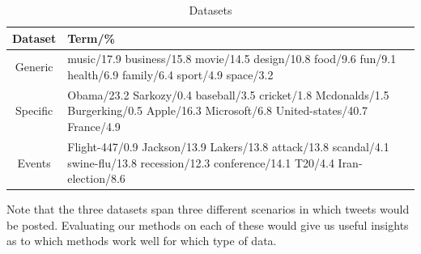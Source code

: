 \documentclass{sig-alternate}
\begin{document}
\begin{table}[!ht]
\centering
\resizebox{8.5cm}{!} 
{
	\begin{tabular}{|c|p{4in}|}
	\hline
        Dataset & Term/\% \\
\hline
Generic &{\small music/17.9 business/15.8 movie/14.5 design/10.8
       food/9.6 fun/9.1 health/6.9 family/6.4 sport/4.9 space/3.2}  \\
Specific &{\small 
Obama/23.2 Sarkozy/0.4 baseball/3.5 cricket/1.8 Mcdonalds/1.5 Burgerking/0.5 Apple/16.3 Microsoft/6.8 United-states/40.7 France/4.9} \\
Events &{\small Flight-447/0.9 Jackson/13.9  Lakers/13.8 attack/13.8 scandal/4.1 swine-flu/13.8 recession/12.3 conference/14.1 T20/4.4 Iran-election/8.6  }\\
	\hline
	\end{tabular}
}
\caption{Datasets}\label{tbl-q}
\end{table}

Note that the three datasets span three different scenarios in which
tweets would be posted. Evaluating our methods on each of these would
give us useful insights as to which methods work well for which type
of data.







\end{document}
